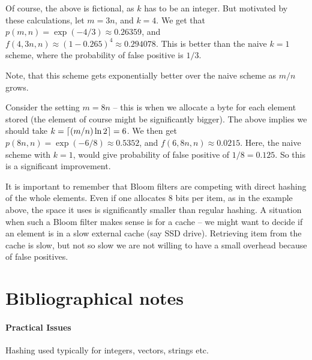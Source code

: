 \begin{example}
    Of course, the above is fictional, as $k$ has to be an
    integer. But motivated by these calculations, let $m=3n$, and
    $k=4$.  We get that $p(m,n) = \exp( -4/3) \approx 0.26359$, and
    $f( 4,3n,n) \approx (1-0.265)^4 \approx 0.294078$. This is
    better than the naive $k=1$ scheme, where the probability of false
    positive is $1/3$.    
\end{example}

Note, that this scheme gets exponentially better over the naive scheme
as $m/n$ grows.

\begin{example}
    Consider the setting $m=8n$ -- this is when we allocate a byte for
    each element stored (the element of course might be significantly
    bigger). The above implies we should take
    $k =\left\lceil { (m/n)\ln 2} \right\rceil = 6$. We then get
    $p(8n,n) = \exp( -6/8) \approx 0.5352$, and
    $f(6,8n,n) \approx 0.0215$. Here, the naive scheme with $k=1$,
    would give probability of false positive of $1/8 =0.125$. So this
    is a significant improvement.
\end{example}

\begin{remark}
    It is important to remember that Bloom filters are competing with
    direct hashing of the whole elements. Even if one allocates $8$
    bits per item, as in the example above, the space it uses is
    significantly smaller than regular hashing. A situation when such
    a Bloom filter makes sense is for a cache -- we might want to
    decide if an element is in a slow external cache (say S{S}D
    drive). Retrieving item from the cache is slow, but not so slow we
    are not willing to have a small overhead because of false
    positives.
\end{remark}





\section{Bibliographical notes}

\paragraph*{Practical Issues}%

Hashing used typically for integers, vectors, strings etc.

